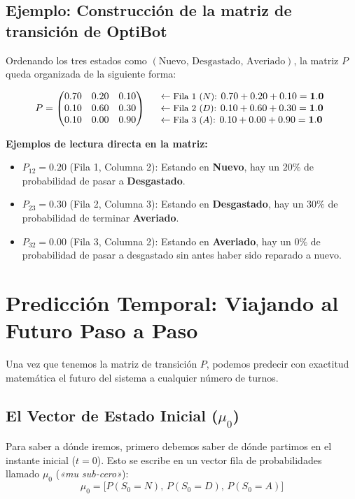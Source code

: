 \subsection*{Ejemplo: Construcción de la matriz de transición de OptiBot}
Ordenando los tres estados como $(\text{Nuevo}, \, \text{Desgastado}, \, \text{Averiado})$, la matriz $P$ queda organizada de la siguiente forma:

\begin{equation}
  P = 
  \begin{pmatrix}
    0.70 & 0.20 & 0.10 \\
    0.10 & 0.60 & 0.30 \\
    0.10 & 0.00 & 0.90
  \end{pmatrix}
  \quad
  \begin{array}{l}
    \leftarrow \text{\small Fila 1 ($N$): } 0.70 + 0.20 + 0.10 = \mathbf{1.0} \\
    \leftarrow \text{\small Fila 2 ($D$): } 0.10 + 0.60 + 0.30 = \mathbf{1.0} \\
    \leftarrow \text{\small Fila 3 ($A$): } 0.10 + 0.00 + 0.90 = \mathbf{1.0}
  \end{array}
\end{equation}

\noindent \textbf{Ejemplos de lectura directa en la matriz:}
\begin{itemize}
  \item $P_{12} = 0.20$ (Fila 1, Columna 2): Estando en \textbf{Nuevo}, hay un $20\%$ de probabilidad de pasar a \textbf{Desgastado}.
  \item $P_{23} = 0.30$ (Fila 2, Columna 3): Estando en \textbf{Desgastado}, hay un $30\%$ de probabilidad de terminar \textbf{Averiado}.
  \item $P_{32} = 0.00$ (Fila 3, Columna 2): Estando en \textbf{Averiado}, hay un $0\%$ de probabilidad de pasar a desgastado sin antes haber sido reparado a nuevo.
\end{itemize}

\section{Predicción Temporal: Viajando al Futuro Paso a Paso}
Una vez que tenemos la matriz de transición $P$, podemos predecir con exactitud matemática el futuro del sistema a cualquier número de turnos.

\subsection*{El Vector de Estado Inicial (\texorpdfstring{$\mu_0$}{mu0})}
Para saber a dónde iremos, primero debemos saber de dónde partimos en el instante inicial ($t=0$). Esto se escribe en un vector fila de probabilidades llamado $\mu_0$ (\textit{«mu sub-cero»}):
\begin{equation}
  \mu_0 = \big[ P(S_0 = N), \, P(S_0 = D), \, P(S_0 = A) \big]
\end{equation}

